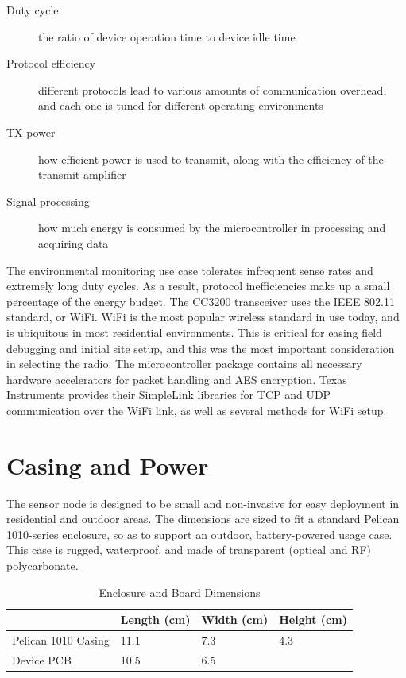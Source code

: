\begin{description}
\item[Duty cycle] the ratio of device operation time to device idle time
\item[Protocol efficiency] different protocols lead to various amounts of communication overhead, and each one is tuned for different operating environments
\item[TX power] how efficient power is used to transmit, along with the efficiency of the transmit amplifier
\item[Signal processing] how much energy is consumed by the microcontroller in processing and acquiring data 
\end{description}

The environmental monitoring use case tolerates infrequent sense rates and extremely long duty cycles. As a result, protocol inefficiencies make up a small percentage of the energy budget. The CC3200 transceiver uses the IEEE 802.11 standard, or WiFi. WiFi is the most popular wireless standard in use today, and is ubiquitous in most residential environments. This is critical for easing field debugging and initial site setup, and this was the most important consideration in selecting the radio. The microcontroller package contains all necessary hardware accelerators for packet handling and AES encryption. Texas Instruments provides their SimpleLink libraries for TCP and UDP communication over the WiFi link, as well as several methods for WiFi setup. 

\section{Casing and Power}

The sensor node is designed to be small and non-invasive for easy deployment in residential and outdoor areas. The dimensions are sized to fit a standard Pelican 1010-series enclosure, so as to support an outdoor, battery-powered usage case. This case is rugged, waterproof, and made of transparent (optical and RF) polycarbonate.

\begin{table}[h]
\begin{tabular}{@{}l|lll@{}}
                    & Length (cm) & Width (cm) & Height (cm) \\ \midrule
Pelican 1010 Casing & 11.1        & 7.3        & 4.3         \\
Device PCB          & 10.5        & 6.5        &            
\end{tabular}
\caption{Enclosure and Board Dimensions}
\label{dimensions}
\end{table}

